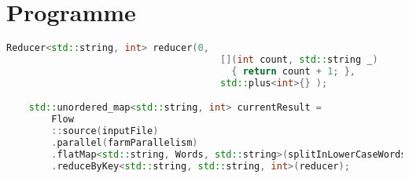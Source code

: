 \section{Programme }
\label{appendice-code-wordcount-f.ann}
\begin{lstlisting}[gobble=4,basicstyle=\ttfamily\footnotesize,language=c++]
    Reducer<std::string, int> reducer(0, 
                                      [](int count, std::string _)
                                        { return count + 1; },
                                      std::plus<int>{} );

    std::unordered_map<std::string, int> currentResult = 
        Flow
        ::source(inputFile)
        .parallel(farmParallelism)
        .flatMap<std::string, Words, std::string>(splitInLowerCaseWords)
        .reduceByKey<std::string, std::string, int>(reducer);  
\end{lstlisting}
